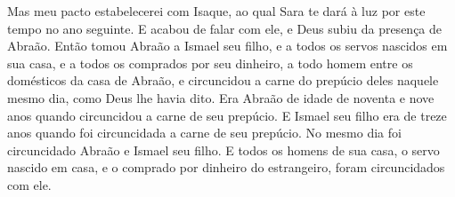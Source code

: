 {{  Mas meu pacto estabelecerei com Isaque, ao qual Sara te dará à luz por este tempo no ano seguinte}.
  E acabou de falar com ele, e Deus subiu da presença de Abraão.
  Então tomou Abraão a Ismael seu filho, e a todos os servos nascidos em sua casa, e a todos os comprados por seu dinheiro, a todo homem entre os domésticos da casa de Abraão, e circuncidou a carne do prepúcio deles naquele mesmo dia, como Deus lhe havia dito.
  Era Abraão de idade de noventa e nove anos quando circuncidou a carne de seu prepúcio.
  E Ismael seu filho era de treze anos quando foi circuncidada a carne de seu prepúcio.
  No mesmo dia foi circuncidado Abraão e Ismael seu filho.
  E todos os homens de sua casa, o servo nascido em casa, e o comprado por dinheiro do estrangeiro, foram circuncidados com ele.
\par }

